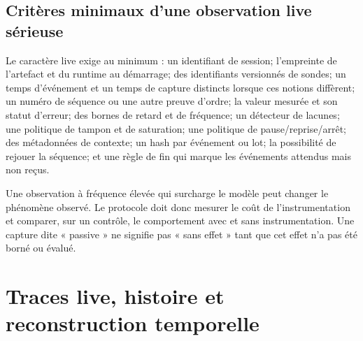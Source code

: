 \documentclass[11pt,oneside]{book}
\theoremstyle{definition}
\theoremstyle{remark}
\newcommand{\1}{\mathbf 1}
\begin{document}
\section{Critères minimaux d'une observation live sérieuse}
Le caractère live exige au minimum : un identifiant de session; l'empreinte de l'artefact et du runtime au démarrage; des identifiants versionnés de sondes; un temps d'événement et un temps de capture distincts lorsque ces notions diffèrent; un numéro de séquence ou une autre preuve d'ordre; la valeur mesurée et son statut d'erreur; des bornes de retard et de fréquence; un détecteur de lacunes; une politique de tampon et de saturation; une politique de pause/reprise/arrêt; des métadonnées de contexte; un hash par événement ou lot; la possibilité de rejouer la séquence; et une règle de fin qui marque les événements attendus mais non reçus.

Une observation à fréquence élevée qui surcharge le modèle peut changer le phénomène observé. Le protocole doit donc mesurer le coût de l'instrumentation et comparer, sur un contrôle, le comportement avec et sans instrumentation. Une capture dite « passive » ne signifie pas « sans effet » tant que cet effet n'a pas été borné ou évalué.

\chapter{Traces live, histoire et reconstruction temporelle}
\end{document}
